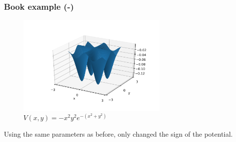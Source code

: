 \documentclass[a4paper,12pt]{article}
\begin{document}
\subsubsection{Book example (-)}

\begin{figure}[H]
	\centering
	\includegraphics[width=0.66\textwidth]{./four_peaks2.png}
	\caption{ $V(x,y) = -x^{2}y^{2}e^{-(x^{2}+y^{2})}$ }
\end{figure}

\par Using the same parameters as before, only changed the sign of the potential.
\end{document}
